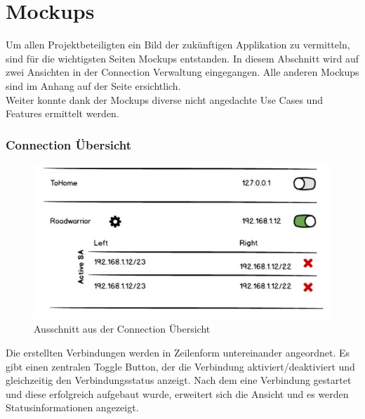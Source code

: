 \section{Mockups}
Um allen Projektbeteiligten ein Bild der zukünftigen Applikation zu vermitteln, sind für die wichtigsten Seiten Mockups entstanden. In diesem Abschnitt wird auf zwei Ansichten in der Connection Verwaltung eingegangen. Alle anderen Mockups sind im Anhang auf der Seite \pageref{Mockups} ersichtlich.\\
Weiter konnte dank der Mockups diverse nicht angedachte Use Cases und Features ermittelt werden.
\subsubsection{Connection Übersicht}
\begin{figure}[H]
	\centering
	\includegraphics[width=330pt]{images/mockups/short_con_overview.jpg}
	\caption{Ausschnitt aus der Connection Übersicht}
\end{figure}
\medskip
Die erstellten Verbindungen werden in Zeilenform untereinander angeordnet. Es gibt einen zentralen Toggle Button, der die Verbindung aktiviert/deaktiviert und gleichzeitig den Verbindungsstatus anzeigt. 
Nach dem eine Verbindung gestartet und diese erfolgreich aufgebaut wurde, erweitert sich die Ansicht und es werden Statusinformationen angezeigt.

